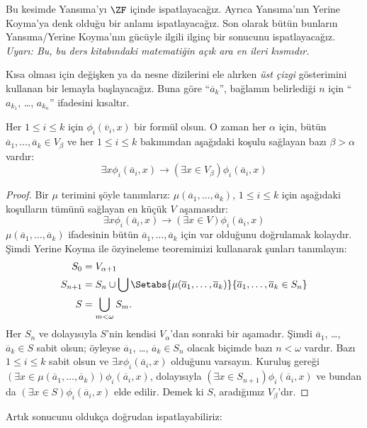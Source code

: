 \documentclass[../../../include/open-logic-section]{subfiles}
\begin{document}

Bu kesimde Yansıma'yı $\ZF$ içinde ispatlayacağız. Ayrıca Yansıma'nın Yerine
Koyma'ya denk olduğu bir anlamı ispatlayacağız. Son olarak bütün bunların
Yansıma/Yerine Koyma'nın gücüyle ilgili ilginç bir sonucunu ispatlayacağız.
\emph{Uyarı: Bu, bu ders kitabındaki matematiğin açık ara en ileri
kısmıdır.}

Kısa olması için değişken ya da nesne dizilerini ele alırken \emph{üst çizgi}
gösterimini kullanan bir lemayla başlayacağız. Buna göre
``$\overline{a}_k$'', bağlamın belirlediği $n$ için ``$a_{k_1}$, \dots,
$a_{k_n}$'' ifadesini kısaltır.

\begin{lem}
Her $1 \leq i \leq k$ için $\phi_i(\overline{v}_i, x)$ bir formül olsun. O
zaman her $\alpha$ için, bütün $\overline{a}_1, \ldots,
\overline{a}_k \in V_\beta$ ve her $1 \leq i \leq k$ bakımından aşağıdaki
koşulu sağlayan bazı $\beta > \alpha$ vardır:
\[
	\exists x\phi_i(\overline{a}_i, x) \rightarrow (\exists x \in V_\beta) \phi_i(\overline{a}_i, x)
\]
\end{lem}

\begin{proof}
Bir $\mu$ terimini şöyle tanımlarız: $\mu(\overline{a}_1, \ldots,
\overline{a}_k)$, $1 \leq i \leq k$ için aşağıdaki koşulların tümünü
sağlayan en küçük $V$ aşamasıdır:
\[
\exists x\phi_i(\overline{a}_i, x) \rightarrow (\exists x \in V) \phi_i(\overline{a}_i, x)
\]
$\mu(\overline{a}_1, \ldots, \overline{a}_k)$ ifadesinin bütün
$\overline{a}_1, \ldots, \overline{a}_k$ için var olduğunu doğrulamak
kolaydır. Şimdi Yerine Koyma ile özyineleme teoremimizi kullanarak şunları
tanımlayın:
\begin{align*}
	S_0 & = V_{\alpha+1}\\
	S_{n+1} & = S_n \cup \bigcup
	\Setabs{\mu(\overline{a}_1, \ldots, \overline{a}_k)}
	{\overline{a}_1, \ldots, \overline{a}_k \in S_n} \\
	S &= \bigcup_{m < \omega} S_m.
\end{align*}
Her $S_n$ ve dolayısıyla $S$'nin kendisi $V_\alpha$'dan sonraki bir aşamadır.
Şimdi $\overline{a}_1$, \dots,~$\overline{a}_k \in S$ sabit olsun; öyleyse
$\overline{a}_1$, \dots, $\overline{a}_k \in S_n$ olacak biçimde bazı
$n < \omega$ vardır. Bazı $1 \leq i \leq k$ sabit olsun ve
$\exists x \phi_i(\overline{a}_i,x)$ olduğunu varsayın. Kuruluş gereği
$(\exists x \in \mu(\overline{a}_1, \ldots,
\overline{a}_k))\phi_i(\overline{a}_i, x)$, dolayısıyla
$(\exists x \in S_{n+1})\phi_i(\overline{a}_i, x)$ ve bundan da
$(\exists x \in S)\phi_i(\overline{a}_i, x)$ elde edilir. Demek ki $S$,
aradığımız $V_\beta$'dır.
\end{proof}
\noindent 
Artık  sonucunu oldukça
doğrudan ispatlayabiliriz:
\end{document}
